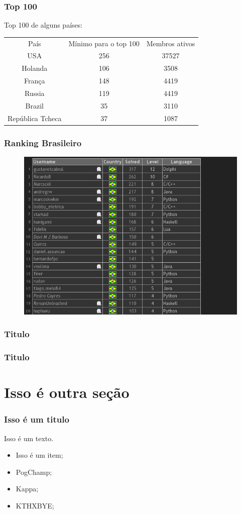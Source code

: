 \documentclass{beamer}
\begin{document}
\begin{frame}
    \frametitle{Top 100}

    Top 100 de alguns países:

\begin{table}[htpb]
    \centering
    \begin{tabular}{c c c}
        País             & Mínimo para o top 100 & Membros ativos \\
        USA              & 256                   & 37527 \\
        Holanda          & 106                   & 3508 \\
        França           & 148                   & 4419 \\
        Russia           & 119                   & 4419 \\
        Brazil           & 35                    & 3110 \\
        República Tcheca & 37                    & 1087 \\
    \end{tabular}
\end{table}

\end{frame}

\begin{frame}
    \frametitle{Ranking Brasileiro}
\begin{figure}[htpb]
    \centering
    \includegraphics[width=0.8\linewidth]{images/top20_br.png}
\end{figure}
\end{frame}

\begin{frame}
    \frametitle{Titulo}

\end{frame}


\begin{frame}
    \frametitle{Titulo}

\end{frame}

\section{Isso é outra seção}
\begin{frame}
    \frametitle{Isso é um titulo}

    Isso é um texto.
    \begin{itemize}
        \item Isso é um item;
        \item PogChamp;
        \item Kappa;
        \item KTHXBYE;
    \end{itemize}
\end{frame}
\end{document}
